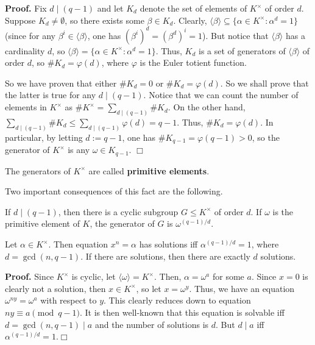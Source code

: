 \documentclass{template}
\newcommand{\qedwhite}{\hfill \ensuremath{\Box}}
\begin{document}
\textbf{Proof.} Fix $d \mid (q-1)$ and let $K_d$ denote the set of elements of
$K^{\times}$ of order $d$. Suppose $K_d \neq \emptyset$, so there exists some
$\beta \in K_d$. Clearly, $\langle \beta \rangle \subseteq \{\alpha \in
K^{\times}: \alpha^d=1\}$ (since for any $\beta^i \in \langle \beta \rangle$,
one has $(\beta^i)^d = (\beta^d)^i=1$). But notice that $\langle \beta \rangle$
has a cardinality $d$, so $\langle \beta \rangle = \{\alpha \in K^{\times}:
\alpha^d=1\}$. Thus, $K_d$ is a set of generators of $\langle \beta \rangle$ of
order $d$, so $\# K_d = \varphi(d)$, where $\varphi$ is the Euler totient
function.

So we have proven that either $\# K_d = 0$ or $\# K_d = \varphi(d)$. So we shall
prove that the latter is true for any $d \mid (q-1)$. Notice that we can count
the number of elements in $K^{\times}$ as $\#K^{\times} = \sum_{d \mid (q-1)}\#
K_d$. On the other hand, $\sum_{d \mid (q-1)}\#K_d \leq \sum_{d \mid
(q-1)}\varphi(d) = q-1$. Thus, $\#K_d=\varphi(d)$. In particular, by letting
$d:=q-1$, one has $\#K_{q-1}=\varphi(q-1)>0$, so the generator of $K^{\times}$
is any $\omega \in K_{q-1}$. \qedwhite

\begin{definition}
    The generators of $K^{\times}$ are called \textbf{primitive elements}.
\end{definition}

Two important consequences of this fact are the following.
\begin{proposition}
    If $d \mid (q-1)$, then there is a cyclic subgroup $G \leq K^{\times}$ of
    order $d$. If $\omega$ is the primitive element of $K$, the generator of $G$
    is $\omega^{(q-1)/d}$.
\end{proposition}

\begin{proposition}
    Let $\alpha \in K^{\times}$. Then equation $x^n=\alpha$ has solutions iff
    $\alpha^{(q-1)/d}=1$, where $d = \gcd(n,q-1)$. If there are solutions, then
    there are exactly $d$ solutions.
\end{proposition}

\textbf{Proof.} Since $K^{\times}$ is cyclic, let $\langle \omega \rangle =
K^{\times}$. Then, $\alpha = \omega^a$ for some $a$. Since $x=0$ is clearly not
a solution, then $x \in K^{\times}$, so let $x=\omega^y$. Thus, we have an
equation $\omega^{ny} = \omega^a$ with respect to $y$. This clearly reduces down
to equation $ny \equiv a \pmod{q-1}$. It is then well-known that this equation
is solvable iff $d = \gcd(n,q-1) \mid a$ and the number of solutions is $d$. But
$d \mid a$ iff $\alpha^{(q-1)/d}=1$.\qedwhite
\end{document}
